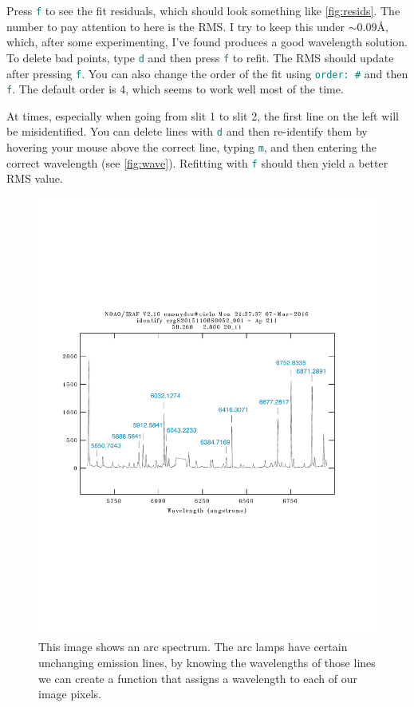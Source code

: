 \documentclass[12pt]{report}
\newcommand{\ty}[1]{\textcolor{teal}{\texttt{#1}}}
\begin{document}
Press \ty{f} to see the fit residuals, which should look something like \autoref{fig:resids}. The number to pay attention to here is the RMS. I try to keep this under $\sim0.09$\AA, which, after some experimenting, I've found produces a good wavelength solution. To delete bad points, type \ty{d} and then press \ty{f} to refit. The RMS should update after pressing \ty{f}. You can also change the order of the fit using \ty{order: \#} and then \ty{f}. The default order is 4, which seems to work well most of the time. 

At times, especially when going from slit 1 to slit 2, the first line on the left will be misidentified. You can delete lines with \ty{d} and then re-identify them by hovering your mouse above the correct line, typing \ty{m}, and then entering the correct wavelength (see \autoref{fig:wave}). Refitting with \ty{f} should then yield a better RMS value.

\begin{figure}[h]
\centering
\includegraphics[scale=0.6]{wavelength_example_new}
\caption[Example of the wavelength solution]{This image shows an arc spectrum. The arc lamps have certain unchanging emission lines, by knowing the wavelengths of those lines we can create a function that assigns a wavelength to each of our image pixels.}
\label{fig:wave}
\end{figure}
\end{document}

